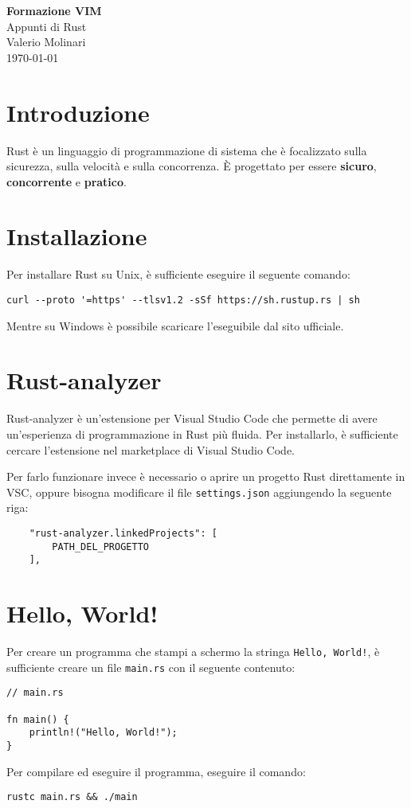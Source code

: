 \documentclass[12pt]{article}
\newcommand{\important}[1]{\textcolor{accent}{\textbf{#1}}}
\begin{document}
\begin{titlepage}
\begin{center}
\vspace*{3cm}
\Huge\textcolor{primary}{\textbf{Formazione VIM}} \\[1cm]
\Large\textcolor{secondary}{Appunti di Rust} \\[1cm]
\textcolor{accent}{Valerio Molinari}\\
\vfill
\today
\end{center}
\end{titlepage}

\tableofcontents
\newpage

\section{Introduzione}
Rust è un linguaggio di programmazione di sistema che è focalizzato 
sulla sicurezza, sulla velocità e sulla concorrenza. 
È progettato per essere \important{sicuro}, \important{concorrente} e 
\important{pratico}.

\section{Installazione}
Per installare Rust su Unix, è sufficiente eseguire il seguente comando:
\begin{verbatim}
curl --proto '=https' --tlsv1.2 -sSf https://sh.rustup.rs | sh
\end{verbatim}
Mentre su Windows è possibile scaricare l'eseguibile dal sito ufficiale.

\section{Rust-analyzer}
Rust-analyzer è un'estensione per Visual Studio Code che permette di
avere un'esperienza di programmazione in Rust più fluida. Per installarlo,
è sufficiente cercare l'estensione nel marketplace di Visual Studio Code.

Per farlo funzionare invece è necessario o aprire un progetto Rust direttamente in VSC,
oppure bisogna modificare il file \texttt{settings.json} aggiungendo la seguente riga:
\begin{verbatim}
    "rust-analyzer.linkedProjects": [
        PATH_DEL_PROGETTO
    ],
\end{verbatim}

\section{Hello, World!}
Per creare un programma che stampi a schermo la stringa \texttt{Hello, World!},
è sufficiente creare un file \texttt{main.rs} con il seguente contenuto:
\begin{verbatim}
// main.rs

fn main() {
    println!("Hello, World!");
}
\end{verbatim}
Per compilare ed eseguire il programma, eseguire il comando:
\begin{verbatim}
rustc main.rs && ./main
\end{verbatim}
\end{document}
